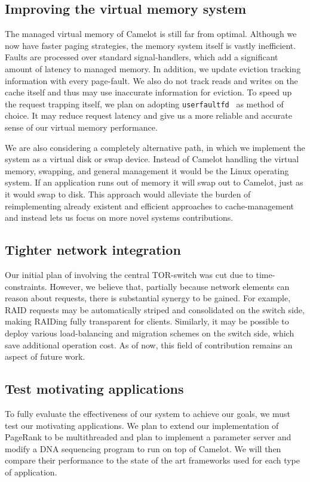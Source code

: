 \subsection{Improving the virtual memory system}
The managed virtual memory of Camelot is still far from optimal. Although we now have faster paging strategies, the memory system itself is vastly inefficient. Faults are processed over standard signal-handlers, which add a significant amount of latency to managed memory. In addition, we update eviction tracking information with every page-fault. We also do not track reads and writes on the cache itself and thus may use inaccurate information for eviction.
To speed up the request trapping itself, we plan on adopting \texttt{userfaultfd}~\cite{userfaultfd} as method of choice. It may reduce request latency and give us a more reliable and accurate sense of our virtual memory performance.

We are also considering a completely alternative path, in which we implement the system as a virtual disk or swap device. Instead of Camelot handling the virtual memory, swapping, and general management it would be the Linux operating system. If an application runs out of memory it will swap out to Camelot, just as it would swap to disk. This approach would alleviate the burden of reimplementing already existent and efficient approaches to cache-management and instead lets us focus on more novel systems contributions.

\subsection{Tighter network integration}
Our initial plan of involving the central TOR-switch was cut due to time-constraints. However, we believe that, partially because network elements can reason about requests, there is substantial synergy to be gained. For example, RAID requests may be automatically striped and consolidated on the switch side, making RAIDing fully transparent for clients. Similarly, it may be possible to deploy various load-balancing and migration schemes on the switch side, which save additional operation cost. 
As of now, this field of contribution remains an aspect of future work.

\subsection{Test motivating applications}
To fully evaluate the effectiveness of our system to achieve our goals, we must
test our motivating applications. We plan to extend our implementation of
PageRank to be multithreaded and plan to implement a parameter server and modify
a DNA sequencing program to run on top of Camelot. We will then compare their
performance to the state of the art frameworks used for each type of
application. 


\label{sec:future}
